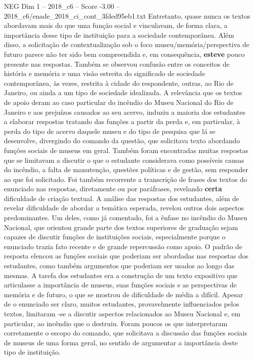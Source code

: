 \begin{textsample}{NEG Dim 1 – 2018\_c6 – Score -3.00 – 2018\_c6/enade\_2018\_ci\_cont\_3fded95eb1.txt}
Entretanto, quase nunca os textos abordavam mais do que uma função social e vinculavam, de forma clara, a importância desse tipo de instituição para a sociedade contemporânea.
Além disso, a solicitação de contextualização sob o foco museu/memória/perspectiva de futuro parece não ter sido bem compreendida e, em consequência, \textbf{esteve} pouco presente nas respostas.
Também se observou confusão entre os conceitos de história e memória e uma visão estreita do significado de sociedade contemporânea, às vezes, restrita à cidade do respondente, outras, ao Rio de Janeiro, ou ainda a um tipo de sociedade idealizada.
A relevância que os textos de apoio deram ao caso particular do incêndio do Museu Nacional do Rio de Janeiro e aos prejuízos causados ao seu acervo, induziu a maioria dos estudantes a elaborar respostas tratando das funções a partir da perda e, em particular, à perda do tipo de acervo daquele museu e do tipo de pesquisa que lá se desenvolve, divergindo do comando da questão, que solicitava texto abordando funções sociais de museus em geral.
Também foram encontradas muitas respostas que se limitavam a discutir o que o estudante considerava como possíveis causas do incêndio, a falta de manutenção, questões políticas e de gestão, sem responder ao que foi solicitado.
Foi também recorrente a transcrição de frases dos textos do enunciado nas respostas, diretamente ou por paráfrases, revelando \textbf{certa} dificuldade de criação textual.
A análise das respostas dos estudantes, além de revelar dificuldade de abordar a temática esperada, revelou outros dois aspectos predominantes.
Um deles, como já comentado, foi a ênfase no incêndio do Museu Nacional, que orientou grande parte dos textos superiores de graduação sejam capazes de discutir funções de instituições sociais, especialmente porque o enunciado trazia fato recente e de grande repercussão como apoio.
O padrão de resposta elencou as funções sociais que poderiam ser abordadas nas respostas dos estudantes, como também argumentos que poderiam ser usados ao longo das mesmas.
A tarefa dos estudantes era a construção de um texto expositivo que articulasse a importância de museus, suas funções sociais e as perspectivas de memória e de futuro, o que se mostrou de dificuldade de média a difícil.
Apesar de o enunciado ser claro, muitos estudantes, provavelmente influenciados pelos textos, limitaram -se a discutir aspectos relacionados ao Museu Nacional e, em particular, ao incêndio que o destruiu.
Foram poucos os que interpretaram corretamente o escopo do comando, que solicitava a discussão das funções sociais de museus de uma forma geral, no sentido de argumentar a importância deste tipo de instituição.

\end{textsample}
